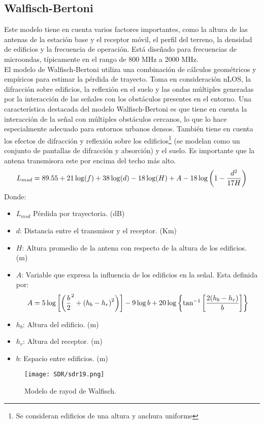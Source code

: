 \documentclass[
	12pt, %
	fleqn, %
	a4paper, %
	oneside, %
]{LegrandOrangeBook}
\begin{document}
\subsection{Walfisch-Bertoni}
Este modelo tiene en cuenta varios factores importantes, como la altura de las antenas de la estación base y el receptor móvil, el perfil del terreno, la densidad de edificios y la frecuencia de operación. Está diseñado para frecuencias de microondas, típicamente en el rango de 800 MHz a 2000 MHz. \\
El modelo de Walfisch-Bertoni utiliza una combinación de cálculos geométricos y empíricos para estimar la pérdida de trayecto. Toma en consideración nLOS, la difracción sobre edificios, la reflexión en el suelo y las ondas múltiples generadas por la interacción de las señales con los obstáculos presentes en el entorno. Una característica destacada del modelo Walfisch-Bertoni es que tiene en cuenta la interacción de la señal con múltiples obstáculos cercanos, lo que lo hace especialmente adecuado para entornos urbanos densos. También tiene en cuenta los efectos de difracción y reflexión sobre los edificios\footnote{Se consideran edificios de una altura y anchura uniforme} (se modelan como un conjunto de pantallas de difracción y absorción) y el suelo. Es importante que la antena transmisora este por encima del techo más alto.
\begin{equation}
L_{msd}=89.55+21\log(f)+38\log(d)-18\log(H)+A-18\log\left(1-\frac{d^2}{17H}\right)
\end{equation}
Donde:
\begin{itemize}
\item $L_{msd}$ Pérdida por trayectoria. (dB)
\item $d$: Distancia entre el transmisor y el receptor. (Km)
\item $H$: Altura promedio de la antena con respecto de la altura de los edificios. (m)
\item $A$: Variable que expresa la influencia de los edificios en la señal. Esta definida por:
\begin{equation}
A=5\log\left[\left(\frac{b}{2}^2+\left(h_b-h_r\right)^2\right)\right]-9\log b+20\log\left\lbrace \tan^{-1}\left[\frac{2(h_b-h_r)}{b}\right]\right\rbrace
\end{equation}
\item $h_b$: Altura del edificio. (m)
\item $h_r$: Altura del receptor. (m)
\item $b$: Espacio entre edificios. (m)
\end{itemize}
\begin{figure}[H]
\centering
\texttt{[image: SDR/sdr19.png]}
\caption{Modelo de rayod de Walfisch.}
\end{figure}
\end{document}
